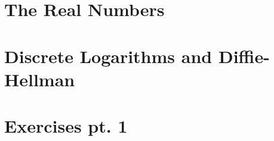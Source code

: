 \documentclass[12pt, oneside]{book}
\renewcommand{\theenumi}{\arabic{enumi}}
\renewcommand{\labelenumi}{\theenumi.}
\begin{document}




	






\chapter{The Real Numbers} \label{Real nums}
\vspace*{-0.25in}


\chapter{Discrete Logarithms and Diffie-Hellman}\label{discrete log}
\vspace*{-0.25in}


\renewcommand{\theenumi}{\alph{enumi}} 
\renewcommand{\labelenumi}{(\theenumi)}
\chapter*{Exercises pt. 1} \label{ex 1}
\vspace*{-0.25in}


% 

% 
\end{document}

